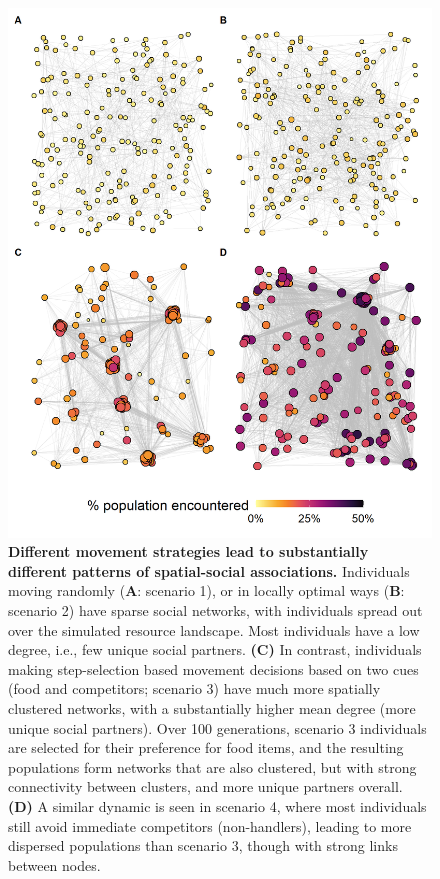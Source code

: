 \begin{interludeenv}
\begin{figure}[h]
    \centering
    \includegraphics[width=0.9\linewidth]{figures/introduction/fig_networks.png}
    \caption{
        \textbf{Different movement strategies lead to substantially different patterns of spatial-social associations.}
        Individuals moving randomly (\textbf{A}: scenario 1), or in locally optimal ways (\textbf{B}: scenario 2) have sparse social networks, with individuals spread out over the simulated resource landscape.
        Most individuals have a low degree, i.e., few unique social partners.
        \textbf{(C)} In contrast, individuals making step-selection based movement decisions based on two cues (food and competitors; scenario 3) have much more spatially clustered networks, with a substantially higher mean degree (more unique social partners).
        Over 100 generations, scenario 3 individuals are selected for their preference for food items, and the resulting populations form networks that are also clustered, but with strong connectivity between clusters, and more unique partners overall.
        \textbf{(D)} A similar dynamic is seen in scenario 4, where most individuals still avoid immediate competitors (non-handlers), leading to more dispersed populations than scenario 3, though with strong links between nodes.
    }
    \label{fig:demo_networks}
  \end{figure}


\end{interludeenv}

